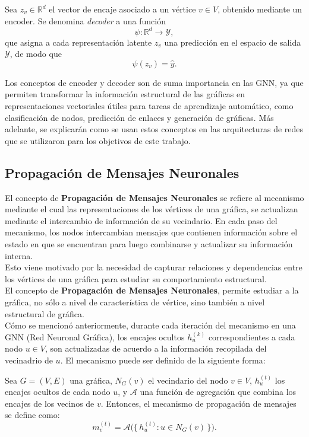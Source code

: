 \begin{definition}[Decoder]
    Sea $z_v \in \mathbb{R}^d$ el vector de encaje asociado a un vértice $v \in V$, obtenido mediante un encoder.
    Se denomina \emph{decoder} a una función
    \[
        \psi : \mathbb{R}^d \longrightarrow \mathcal{Y},
    \]
    que asigna a cada representación latente $z_v$ una predicción en el espacio de salida $\mathcal{Y}$, de modo que
    \[
        \psi(z_v) = \hat{y}.
    \]
\end{definition}

Los conceptos de encoder y decoder son de suma importancia en las GNN, ya que permiten transformar la información estructural de las gráficas en representaciones vectoriales útiles para tareas de aprendizaje automático, como clasificación de nodos, predicción de enlaces y generación de gráficas.
Más adelante, se explicarán como se usan estos conceptos en las arquitecturas de redes que se utilizaron para los objetivos de este trabajo.

\subsection{Propagación de Mensajes Neuronales}
El concepto de \textbf{Propagación de Mensajes Neuronales} se refiere al mecanismo mediante el cual las representaciones de los vértices de una gráfica, se actualizan mediante el intercambio de información de su vecindario.
En cada paso del mecanismo, los nodos intercambian mensajes que contienen información sobre el estado en que se encuentran para luego combinarse y actualizar su información interna.\\
Esto viene motivado por la necesidad de capturar relaciones y dependencias entre los vértices de una gráfica para estudiar su comportamiento estructural.\\
El concepto de \textbf{Propagación de Mensajes Neuronales}, permite estudiar a la gráfica, no sólo a nivel de característica de vértice, sino también a nivel estructural de gráfica.\\

Cómo se mencionó anteriormente, durante cada iteración del mecanismo en una GNN (Red Neuronal Gráfica), los encajes ocultos $h_u^{(k)}$ correspondientes a cada nodo $u \in V$, son actualizadas de acuerdo a la información recopilada del vecinadrio de $u$.
El mecanismo puede ser definido de la siguiente forma:

\begin{definition}

    Sea $G = (V, E)$ una gráfica, $N_G(v)$ el vecindario del nodo $v \in V$, $h_u^{(t)}$ los encajes ocultos de cada nodo $u$, y $\mathscr{A}$ una función de agregación que combina los encajes de los vecinos de $v$. Entonces, el mecanismo de propagación de mensajes se define como:
    \[
        m_v^{(t)} = \mathscr{A}\bigl(\{\,h_u^{(t)} : u \in N_G(v)\,\}\bigr).
    \]
\end{definition}

